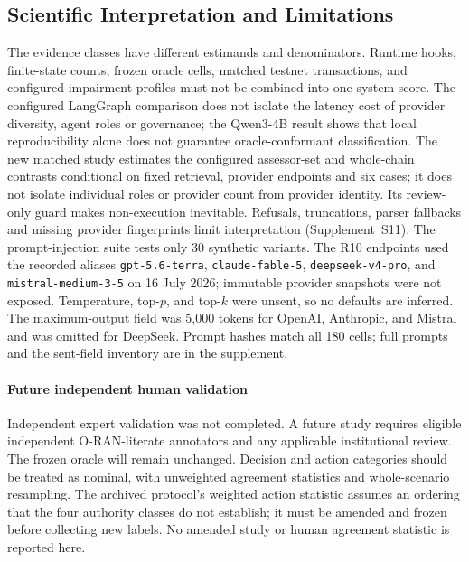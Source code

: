 \documentclass[journal]{IEEEtran}
\newif\ifshowrevisions
\newenvironment{revision}{\begingroup\ifshowrevisions\color{blue}\else\color{black}\fi}{\endgroup}
\begin{document}


\begin{revision}
\subsection{Scientific Interpretation and Limitations}
The evidence classes have different estimands and denominators. Runtime hooks,
finite-state counts, frozen oracle cells, matched testnet transactions, and
configured impairment profiles must not be combined into one system score.
The configured LangGraph comparison does not isolate the latency cost of
provider diversity, agent roles or governance; the Qwen3-4B result
shows that local reproducibility alone does not guarantee oracle-conformant classification.
The new matched study estimates the configured assessor-set and whole-chain
contrasts conditional on fixed retrieval, provider endpoints and six cases;
it does not isolate individual roles or provider count from provider identity.
Its review-only guard makes non-execution inevitable. Refusals, truncations,
parser fallbacks and missing provider fingerprints limit interpretation
(Supplement~S11). The prompt-injection suite tests only 30 synthetic variants.
The R10 endpoints used the recorded aliases \texttt{gpt-5.6-terra},
\texttt{claude-fable-5}, \texttt{deepseek-v4-pro}, and
\texttt{mistral-medium-3-5} on 16 July 2026; immutable provider snapshots were
not exposed. Temperature, top-$p$, and top-$k$ were unsent, so no defaults are
inferred. The maximum-output field was 5{,}000 tokens for OpenAI, Anthropic,
and Mistral and was omitted for DeepSeek. Prompt hashes match all 180 cells;
full prompts and the sent-field inventory are in the supplement.
\paragraph{Future independent human validation}
Independent expert validation was not completed. A future study requires eligible independent O-RAN-literate annotators and
any applicable institutional review. The frozen oracle will remain unchanged.
Decision and action categories should be treated as nominal, with unweighted
agreement statistics and whole-scenario resampling. The archived protocol's
weighted action statistic assumes an ordering that the four authority classes
do not establish; it must be amended and frozen before collecting new labels.
No amended study or human agreement statistic is reported here.
\end{revision}
\end{document}
